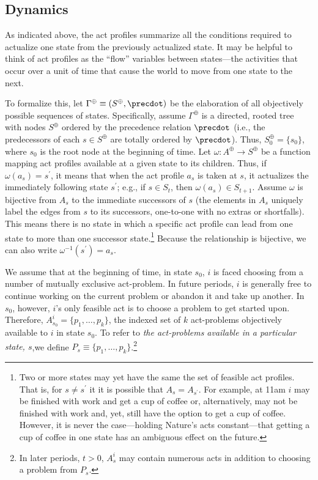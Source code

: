 \documentclass[
11pt,
titlepage,
reqno,
]{article}%
\theoremstyle{definition}
\begin{document}
 
 
 
	
\subsection{Dynamics} 
	
As indicated above, the act profiles summarize all the conditions required to actualize one state from the previously actualized state. 	It may be helpful to think of act profiles as the ``flow'' variables between states---the activities that occur over a unit of time that cause the world to move from one state to the next.
	
To formalize this,  let $\Gamma^\oplus\equiv( S^\oplus,\precdot)$ be the elaboration of all objectively possible sequences of states.
Specifically, assume $\Gamma^\oplus$ is a directed, rooted tree with nodes $S^\oplus$ ordered by the precedence relation $\precdot$ (i.e., the predecessors of each $s\in S^\oplus$ are totally ordered by $\precdot$). 
Thus, $S^\oplus_0=\{s_0\}$, where $s_0$ is the root node at the beginning of time.
Let $\omega:A^\oplus\rightarrow S^\oplus$ be a function mapping act profiles available at a given state to its children.	
Thus, if $\omega(a_s)=s^\prime$, it means that when the act profile $a_s$ is taken at $s$, it actualizes the immediately following state $s^\prime$; e.g., if $s\in S_t$, then $\omega(a_s)\in S_{t+1}$.
Assume $\omega$ is bijective from $A_s$ to the immediate successors of $s$ (the elements in $A_s$ uniquely label the edges from $s$ to its successors, one-to-one with no extras or shortfalls).
This means there is no state in which a specific act profile can lead from one state to more than one successor state.\footnote
{ 
	Two or more states may yet have the same the set of feasible act profiles. That is, for $s\ne s^\prime$ it it is possible that $A_s=A_{s^\prime}$. For example, at 11am $i$ may be finished with  work and get a cup of coffee or, alternatively, may not be finished with work and, yet, still have the option to get a cup of coffee. However, it is never the case---holding Nature's acts constant---that getting a cup of coffee in one state has an ambiguous effect on the future.
}
Because the relationship is bijective, we can also write $\omega^{-1}(s^\prime)=a_s$.

We assume that at the beginning of time, in state $s_0$, $i$ is faced choosing from  a number of mutually exclusive act-problem.
In future periods, $i$ is generally free to continue working on the current problem or abandon it and take up another. 
In $s_0$, however, $i$'s only feasible act is to choose a problem to get started upon. 
Therefore, $A^i_{s_0}=\{p_1,\ldots,p_k\}$, the indexed set of $k$ act-problems objectively available to $i$ in state $s_0$.
To refer to \textit{the act-problems available in a particular state, $s$},we define $P_s\equiv \{p_1,\ldots,p_k\}$.\footnote
{
	In later periods, $t>0$, $A^i_s$ may contain numerous acts in addition to choosing a problem from $P_s$.
}
	
\end{document}
